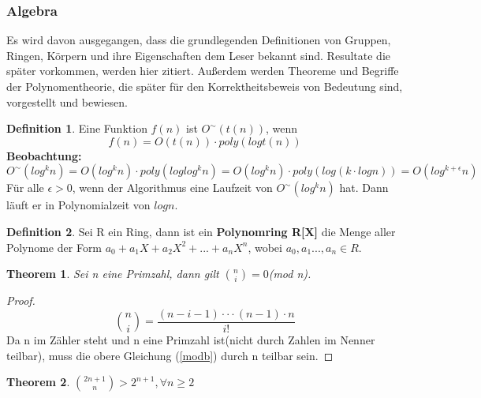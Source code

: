 \documentclass[12pt,oneside]{article}
\newtheorem{theorem}{Theorem}[section]
\theoremstyle{remark}
\theoremstyle{definition}
\newtheorem{definition}{Definition}[section]
\begin{document}
\subsubsection{Algebra}
Es wird davon ausgegangen, dass die grundlegenden Definitionen von Gruppen, Ringen, Körpern und ihre Eigenschaften dem Leser bekannt sind. Resultate die später vorkommen, werden hier zitiert. Außerdem werden Theoreme und Begriffe der Polynomentheorie, die später für den Korrektheitsbeweis von Bedeutung sind, vorgestellt und bewiesen.
\begin{flushleft}
\begin{definition}
Eine Funktion $f(n)$ ist $ O^{\sim}(t(n))$, wenn
\begin{equation}
    f(n) = O(t(n)) \cdot poly(log t(n))
\end{equation}
\textbf{Beobachtung:}
\begin{equation}
    O^{\sim}(log^k n) = O(log^k n) \cdot poly(log log^k n) = O(log^k n) \cdot poly(log( k \cdot log n)) = O(log^{k+\epsilon}n)
\end{equation}
Für alle $\epsilon > 0$, wenn der Algorithmus eine Laufzeit von $O^{\sim}(log^k n)$ hat. Dann läuft er in Polynomialzeit von $log n$.
\end{definition}

\smallskip

\begin{definition}
Sei R ein Ring, dann ist ein \textbf{Polynomring R[X]} die Menge aller Polynome der Form $a_{0} + a_{1}X + a_{2} X^2 + ... + a_{n}X^n$, wobei $a_{0},a_{1}...,a_{n} \in R$.
\end{definition}

\smallskip 

\begin{theorem}\label{th_25}
Sei n eine Primzahl, dann gilt ${n \choose i} = 0 $(mod n).
\end{theorem}

\begin{proof}
\begin{equation}\label{modb}
    {n \choose i} = \frac{(n - i - 1) \cdot \cdot \cdot (n - 1) \cdot n }{i!}
\end{equation}
Da n im Zähler steht und n eine Primzahl ist(nicht durch Zahlen im Nenner teilbar), muss die obere Gleichung (\ref{modb}) durch n teilbar sein. 
\end{proof}

\smallskip
\begin{flushleft}
\begin{theorem}
${2n + 1 \choose n} > 2^{n+1}, \forall n \geq 2$
\end{theorem}


\end{flushleft}
\end{flushleft}
\end{document}

